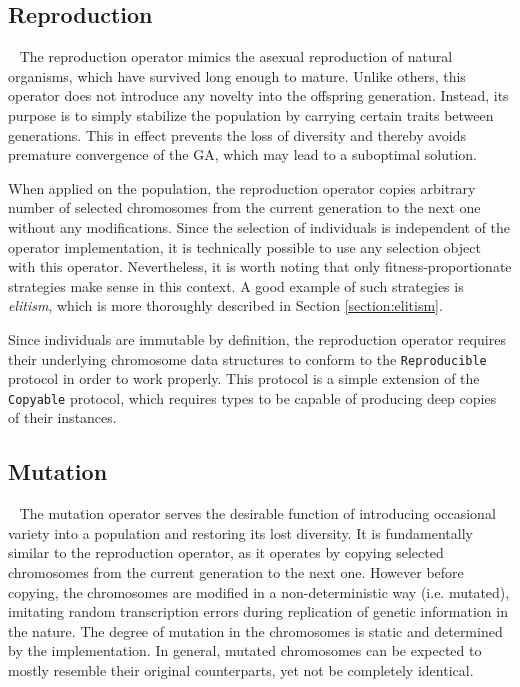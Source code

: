 \subsection{Reproduction}~\label{section:reproduction}
The reproduction operator mimics the asexual reproduction of natural organisms, which have survived long enough to mature. Unlike others, this operator does not introduce any novelty into the offspring generation. Instead, its purpose is to simply stabilize the population by carrying certain traits between generations. This in effect prevents the loss of diversity and thereby avoids premature convergence of the GA, which may lead to a suboptimal solution.

When applied on the population, the reproduction operator copies arbitrary number of selected chromosomes from the current generation to the next one without any modifications. Since the selection of individuals is independent of the operator implementation, it is technically possible to use any selection object with this operator. Nevertheless, it is worth noting that only fitness-proportionate strategies make sense in this context. A good example of such strategies is \textit{elitism}, which is more thoroughly described in Section \ref{section:elitism}.

Since individuals are immutable by definition, the reproduction operator requires their underlying chromosome data structures to conform to the \texttt{Reproducible} protocol in order to work properly. This protocol is a simple extension of the \texttt{Copyable} protocol, which requires types to be capable of producing deep copies of their instances.

\subsection{Mutation}~\label{section:mutation}
The mutation operator serves the desirable function of introducing occasional variety into a population and restoring its lost diversity. \cite{Koza1992} It is fundamentally similar to the reproduction operator, as it operates by copying selected chromosomes from the current generation to the next one. However before copying, the chromosomes are modified in a non-deterministic way (i.e. mutated), imitating random transcription errors during replication of genetic information in the nature. The degree of mutation in the chromosomes is static and determined by the implementation. In general, mutated chromosomes can be expected to mostly resemble their original counterparts, yet not be completely identical.

